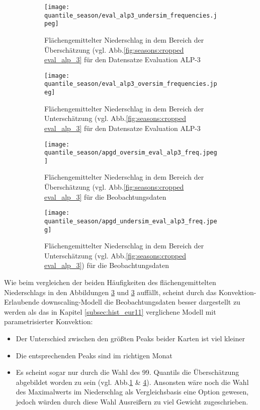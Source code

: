 \begin{figure}[h]
	\begin{subfigure}{0.49\textwidth}
		\texttt{[image: quantile\_season/eval\_alp3\_undersim\_frequencies.jpeg]}
		\caption{Flächengemittelter Niederschlag in dem Bereich der Überschätzung (vgl. Abb.\ref{fig:seasons:cropped eval_alp_3} für den Datensatze Evaluation ALP-3}
		\label{fig:seasons:oversim eval_alp_3}
	\end{subfigure}
	\begin{subfigure}{0.49\textwidth}
		\texttt{[image: quantile\_season/eval\_alp3\_oversim\_frequencies.jpeg]}
		\caption{Flächengemittelter Niederschlag in dem Bereich der Unterschätzung (vgl. Abb.\ref{fig:seasons:cropped eval_alp_3} für den Datensatze Evaluation ALP-3}
		\label{fig:seasons:undersim_eval_alp_3}
	\end{subfigure}
	\caption{}
	\label{fig:seasons:overunder_eval_alp3}
\end{figure}
\begin{figure}[h]
	\begin{subfigure}{0.49\textwidth}
		\texttt{[image: quantile\_season/apgd\_oversim\_eval\_alp3\_freq.jpeg]}
		\caption{Flächengemittelter Niederschlag in dem Bereich der Überschätzung (vgl. Abb.\ref{fig:seasons:cropped eval_alp_3} für die Beobachtungsdaten}
		\label{fig:seasons:oversim eval_alp_3_obs}
	\end{subfigure}
	\begin{subfigure}{0.49\textwidth}
		\texttt{[image: quantile\_season/apgd\_undersim\_eval\_alp3\_freq.jpeg]}
		\caption{Flächengemittelter Niederschlag in dem Bereich der Unterschätzung (vgl. Abb.\ref{fig:seasons:cropped eval_alp_3}) für die Beobachtungsdaten}
		\label{fig:seasons:undersim_eval_alp_3_obs}
	\end{subfigure}
	\caption{}
	\label{fig:seasons:overunder_obs_eval_alp3}
\end{figure}
Wie beim vergleichen der beiden Häufigkeiten des flächengemittelten Niederschlags in den Abbildungen \ref{fig:seasons:overunder_eval_alp3} und \ref{fig:seasons:overunder_eval_alp3} auffällt, scheint durch das Konvektion-Erlaubende downscaling-Modell die Beobachtungsdaten besser dargestellt zu werden als das in Kapitel \ref{subsec:hist_eur11} verglichene Modell mit parametrisierter Konvektion:
\begin{itemize}
	\item Der Unterschied zwischen den größten Peaks beider Karten ist viel kleiner
	\item Die entsprechenden Peaks sind im richtigen Monat
	\item Es scheint sogar nur durch die Wahl des 99. Quantils die Überschätzung abgebildet worden zu sein (vgl. Abb.\ref{fig:seasons:oversim eval_alp_3} \& \ref{fig:seasons:oversim eval_alp_3_obs}). Ansonsten wäre noch die Wahl des Maximalwerts im Niederschlag als Vergleichsbasis eine Option gewesen, jedoch würden durch diese Wahl Ausreißern zu viel Gewicht zugeschrieben.
\end{itemize}
